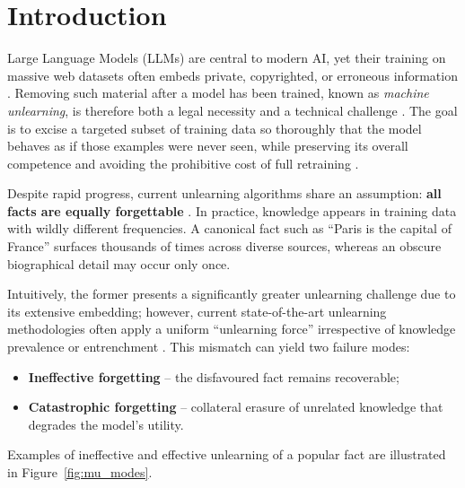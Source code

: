 \section{Introduction}
\label{sec:intro}


Large Language Models (LLMs) are central to modern AI, yet their training on massive web datasets often embeds private, copyrighted, or erroneous information \cite{wei2024evaluating, jang2023knowledge, NEURIPS2024_b1f78dfc}.
Removing such material after a model has been trained, known as \textit{machine unlearning}, is therefore both a legal necessity and a technical challenge \cite{ren2025keeping}.
The goal is to excise a targeted subset of training data so thoroughly that the model behaves as if those examples were never seen, while preserving its overall competence and avoiding the prohibitive cost of full retraining \cite{geng2025comprehensive, jang2023knowledge, zagardo2024more}.

Despite rapid progress, current unlearning algorithms share an assumption: \textbf{all facts are equally forgettable} \cite{geng2025comprehensive, hu2024unlearning}.  
In practice, knowledge appears in training data with wildly different frequencies.  
A canonical fact such as \enquote{Paris is the capital of France} surfaces thousands of times across diverse sources, whereas an obscure biographical detail may occur only once.  

Intuitively, the former presents a significantly greater unlearning challenge due to its extensive embedding; however, current state-of-the-art unlearning methodologies often apply a uniform \enquote{unlearning force} irrespective of knowledge prevalence or entrenchment \cite{ren2025keeping, NEURIPS2024_16e18fa3}.
This mismatch can yield two failure modes:
\begin{itemize}
    \item \textbf{Ineffective forgetting} – the disfavoured fact remains recoverable;
    \item \textbf{Catastrophic forgetting} – collateral erasure of unrelated knowledge that degrades the model’s utility.
\end{itemize}

Examples of ineffective and effective unlearning of a popular fact are illustrated in Figure~\ref{fig:mu_modes}. 

